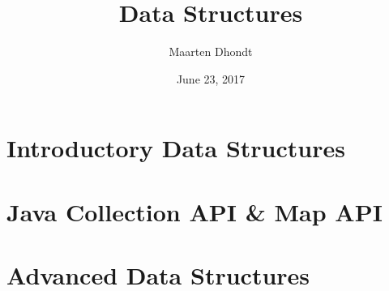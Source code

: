 \documentclass{beamer}
\title{Data Structures}
\author{Maarten Dhondt}
\institute{Realdolmen}
\date{June 23, 2017}
\begin{document}
\frame{\titlepage}

\section{Introductory Data Structures}
\section{Java Collection API \& Map API}
\section{Advanced Data Structures}
\end{document}
